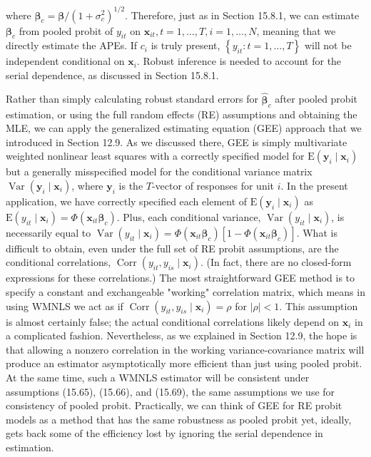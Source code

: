 \documentclass[10pt]{article}
\begin{document}
where $\boldsymbol{\beta}_{c}=\boldsymbol{\beta} /\left(1+\sigma_{c}^{2}\right)^{1 / 2}$. Therefore, just as in Section 15.8.1, we can estimate $\boldsymbol{\beta}_{c}$ from pooled probit of $y_{i t}$ on $\mathbf{x}_{i t}, t=1, \ldots, T, i=1, \ldots, N$, meaning that we directly estimate the APEs. If $c_{i}$ is truly present, $\left\{y_{i t}: t=1, \ldots, T\right\}$ will not be independent conditional on $\mathbf{x}_{i}$. Robust inference is needed to account for the serial dependence, as discussed in Section 15.8.1.

Rather than simply calculating robust standard errors for $\hat{\boldsymbol{\beta}}_{c}$ after pooled probit estimation, or using the full random effects (RE) assumptions and obtaining the MLE, we can apply the generalized estimating equation (GEE) approach that we introduced in Section 12.9. As we discussed there, GEE is simply multivariate weighted nonlinear least squares with a correctly specified model for $\mathrm{E}\left(\mathbf{y}_{i} \mid \mathbf{x}_{i}\right)$ but a generally misspecified model for the conditional variance matrix $\operatorname{Var}\left(\mathbf{y}_{i} \mid \mathbf{x}_{i}\right)$, where $\mathbf{y}_{i}$ is the $T$-vector of responses for unit $i$. In the present application, we have correctly specified each element of $\mathrm{E}\left(\mathbf{y}_{i} \mid \mathbf{x}_{i}\right)$ as $\mathrm{E}\left(y_{i t} \mid \mathbf{x}_{i}\right)=\Phi\left(\mathbf{x}_{i t} \boldsymbol{\beta}_{c}\right)$. Plus, each conditional variance, $\operatorname{Var}\left(y_{i t} \mid \mathbf{x}_{i}\right)$, is necessarily equal to $\operatorname{Var}\left(y_{i t} \mid \mathbf{x}_{i}\right)=\Phi\left(\mathbf{x}_{i t} \boldsymbol{\beta}_{c}\right)\left[1-\Phi\left(\mathbf{x}_{i t} \boldsymbol{\beta}_{c}\right)\right]$. What is difficult to obtain, even under the full set of RE probit assumptions, are the conditional correlations, $\operatorname{Corr}\left(y_{i t}, y_{i s} \mid \mathbf{x}_{i}\right)$. (In fact, there are no closed-form expressions for these correlations.) The most straightforward GEE method is to specify a constant and exchangeable "working" correlation matrix, which means in using WMNLS we act as if $\operatorname{Corr}\left(y_{i t}, y_{i s} \mid \mathbf{x}_{i}\right)=\rho$ for $|\rho|<1$. This assumption is almost certainly false; the actual conditional correlations likely depend on $\mathbf{x}_{i}$ in a complicated fashion. Nevertheless, as we explained in Section 12.9, the hope is that allowing a nonzero correlation in the working variance-covariance matrix will produce an estimator asymptotically more efficient than just using pooled probit. At the same time, such a WMNLS estimator will be consistent under assumptions (15.65), (15.66), and (15.69), the same assumptions we use for consistency of pooled probit. Practically, we can think of GEE for RE probit models as a method that has the same robustness as pooled probit yet, ideally, gets back some of the efficiency lost by ignoring the serial dependence in estimation.
\end{document}
